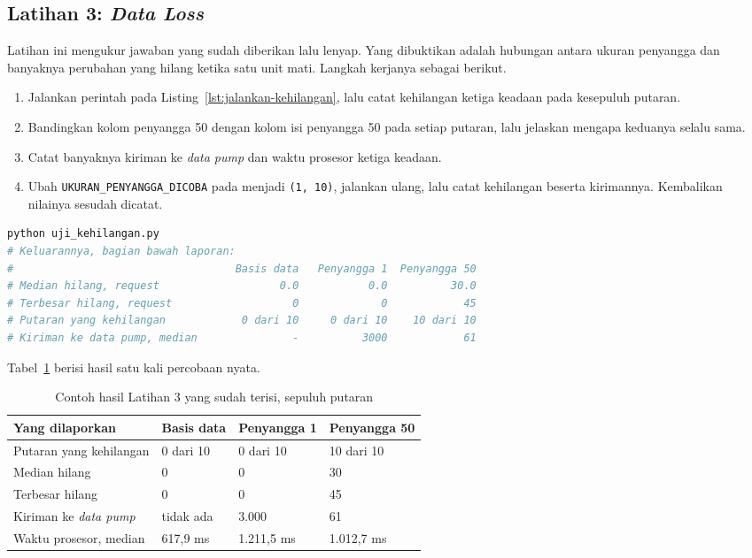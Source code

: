 \subsection*{Latihan 3: \textit{Data Loss}}

Latihan ini mengukur jawaban yang sudah diberikan lalu lenyap. Yang dibuktikan
adalah hubungan antara ukuran penyangga dan banyaknya perubahan yang hilang
ketika satu unit mati. Langkah kerjanya sebagai berikut.

\begin{enumerate}
  \item Jalankan perintah pada Listing~\ref{lst:jalankan-kehilangan}, lalu catat
    kehilangan ketiga keadaan pada kesepuluh putaran.
  \item Bandingkan kolom penyangga 50 dengan kolom isi penyangga 50 pada setiap
    putaran, lalu jelaskan mengapa keduanya selalu sama.
  \item Catat banyaknya kiriman ke \textit{data pump} dan waktu prosesor ketiga
    keadaan.
  \item Ubah \texttt{UKURAN\_PENYANGGA\_DICOBA} pada
     menjadi \texttt{(1, 10)},
    jalankan ulang, lalu catat kehilangan beserta kirimannya. Kembalikan
    nilainya sesudah dicatat.
\end{enumerate}

\begin{lstlisting}[language=bash, caption={Mengukur \textit{data loss}, skrip
  tersedia di \berkas{sources/chapter08/uji_kehilangan.py}},
  label=lst:jalankan-kehilangan]
python uji_kehilangan.py
# Keluarannya, bagian bawah laporan:
#                                   Basis data   Penyangga 1  Penyangga 50
# Median hilang, request                   0.0           0.0          30.0
# Terbesar hilang, request                   0             0            45
# Putaran yang kehilangan            0 dari 10     0 dari 10    10 dari 10
# Kiriman ke data pump, median               -          3000            61
\end{lstlisting}

Tabel~\ref{tab:lat3ruang-contoh} berisi hasil satu kali percobaan nyata.

\begin{table}[htbp]
  \centering
  \caption{Contoh hasil Latihan 3 yang sudah terisi, sepuluh putaran}
  \label{tab:lat3ruang-contoh}
  \begin{tabularx}{\textwidth}{|X|l|l|l|}
    \hline
    \textbf{Yang dilaporkan} & \textbf{Basis data} & \textbf{Penyangga 1} & \textbf{Penyangga 50} \\
    \hline
    Putaran yang kehilangan & 0 dari 10 & 0 dari 10 & 10 dari 10 \\
    \hline
    Median hilang & 0 & 0 & 30 \\
    \hline
    Terbesar hilang & 0 & 0 & 45 \\
    \hline
    Kiriman ke \textit{data pump} & tidak ada & 3.000 & 61 \\
    \hline
    Waktu prosesor, median & 617,9 ms & 1.211,5 ms & 1.012,7 ms \\
    \hline
  \end{tabularx}
\end{table}

